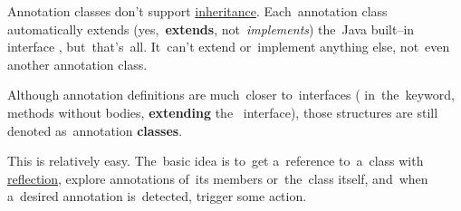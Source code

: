 \warning Annotation classes don't support \hyperref[inheritance]{inheritance}.
Each~annotation class automatically extends (yes,~\textbf{extends}, not~\textit{implements}) the~Java built--in interface , but~that's~all.
It~can't extend or~implement anything else, not~even another annotation class.
\newpage

\warning Although annotation definitions are much~closer to~interfaces ( in~the~keyword, methods without bodies, \textbf{extending} the~ interface), those structures are still denoted as~annotation \textbf{classes}.

This is relatively easy.
The~basic idea is to~get a~reference to~a~class with \hyperref[reflection]{reflection}, explore annotations of~its members or~the~class itself, and~when a~desired annotation is~detected, trigger some action.

